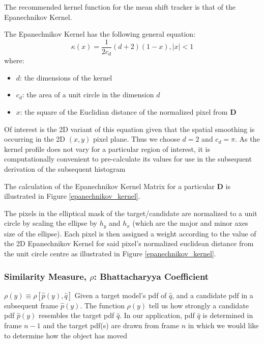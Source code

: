 The recommended kernel function for the mean shift tracker is that of the
Epanechnikov Kernel.

The Epanechnikov Kernel has the following general equation:
\begin{equation}
    \kappa(x)=\frac{1}{2 c_d}(d+2)(1-x), |x|<1
\end{equation}
where:
\begin{itemize}
   \item $d$: the dimensions of the kernel
   \item $c_d$: the area of a unit circle in the dimension $d$
   \item $x$: the square of the Euclidian distance of the normalized pixel from $\mathbf{D}$
\end{itemize}

Of interest is the 2D variant of this equation given that the spatial smoothing
is occurring in the 2D $(x,y)$ pixel plane. Thus we choose $d=2$ and $c_d=\pi$.
As the kernel profile does not vary for a particular region of interest, it is
computationally convenient to pre-calculate its values for use in the subsequent
derivation of the subsequent histogram

The calculation of the Epanechnikov Kernel Matrix for a particular $\mathbf{D}$ is
illustrated in Figure \ref{epanechnikov_kernel}.


The pixels in the elliptical mask of the target/candidate are normalized to a unit
circle by scaling the ellipse by $h_y$ and $h_x$ (which are the major and minor
axes size of the ellipse). Each pixel is then assigned a weight according to the
value of the 2D Epanechnikov Kernel for said pixel's normalized euclidean
distance from the unit circle centre as illustrated in Figure \ref{epanechnikov_kernel}.

\subsubsection{Similarity Measure, $\rho$: Bhattacharyya Coefficient}

$\rho(y) \equiv \rho[\hat{p}(y),\hat{q}]$
Given a target model's pdf of $\hat{q}$, and a candidate pdf in a subsequent
frame $\hat{p}(y)$.  The function $\rho(y)$ tell us how strongly a candidate pdf
$\hat{p}(y)$ resembles the target pdf $\hat{q}$. In our application, pdf
$\hat{q}$ is determined in frame $n-1$ and the target pdf(s) are drawn from
frame $n$ in which we would like to determine how the object has moved

